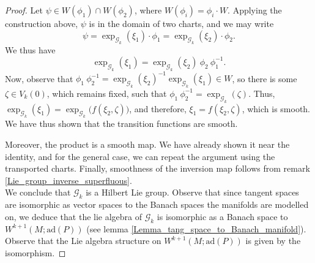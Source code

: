 \begin{proof}
    Let \(\psi \in W(\phi_1) \cap W(\phi_2)\), where \(W(\phi_i)=\phi_i \cdot W\). Applying the construction above, \(\psi\) is in the domain of two charts, and we may write
    \[
    \psi=\exp_{\mathscr{G}_k}(\xi_1)\cdot \phi_1 = \exp_{\mathscr{G}_k}(\xi_2)\cdot \phi_2.
    \]
    We thus have
    \[
    \exp_{\mathscr{G}_k}(\xi_1) = \exp_{\mathscr{G}_k}(\xi_2) \ \phi_2 \ \phi_1^{-1}.
    \]
    Now, observe that \(\phi_1 \ \phi_2^{-1}=\exp_{\mathscr{G}_k}(\xi_2)^{-1} \exp_{\mathscr{G}_k}(\xi_1) \in W\), so there is some \(\zeta\in V_k(0)\), which remains fixed, such that \(\phi_1 \ \phi_2^{-1}=\exp_{\mathscr{G}_k}(\zeta)\). Thus, \(\exp_{\mathscr{G}_k}(\xi_1)=\exp_{\mathscr{G}_k}\big(f(\xi_2, \zeta)\big)\), and therefore, \(\xi_1=f(\xi_2, \zeta)\), which is smooth. We have thus shown that the transition functions are smooth.

    Moreover, the product is a smooth map. We have already shown it near the identity, and for the general case, we can repeat the argument using the transported charts. Finally, smoothness of the inversion map follows from remark \ref{Lie_group_inverse_superfluous}. \\

    We conclude that \(\mathscr{G}_k\) is a Hilbert Lie group. Observe that since tangent spaces are isomorphic as vector spaces to the Banach spaces the manifolds are modelled on, we deduce that the lie algebra of \(\mathscr{G}_k\) is isomorphic as a Banach space to \(W^{k+1}(M;\mathrm{ad}(P))\) (see lemma \ref{Lemma_tang_space_to_Banach_manifold}). Observe that the Lie algebra structure on \(W^{k+1}(M; \mathrm{ad}(P))\) is given by the isomorphism.
\end{proof}




